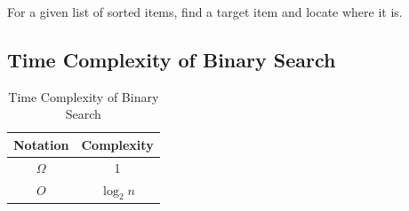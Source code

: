 \begin{problem}
  For a given list of sorted items,
  find a target item and locate where it is.
\end{problem}

\begin{algorithm}
  \caption{Binary Search Algorithm}
  \label{binary-search-algorithm}
\end{algorithm}

\subsection{Time Complexity of Binary Search}
\label{ssec:time-complexity-of-binary-search}
\begin{table}[htbp]
  \centering
  \begin{tabular}{|c|c|}
    \hline
    Notation&Complexity\\
    \hline
    \(\Omega\)&1\\
    \(O\)&\(\log_2{n}\)\\
    \hline
  \end{tabular}
  \caption{Time Complexity of Binary Search}
  \label{tab:time-complexity-of-linear-search}
\end{table}

\begin{listing}[htbp]
  \inputminted{python}{Code/binary_search.py}
  \caption{Binary Search Implementation}
  \label{linear-search-implementation}
\end{listing}
